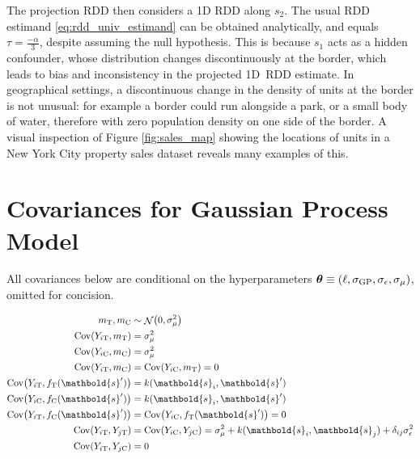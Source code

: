 \documentclass[letter]{article}
\DeclarePairedDelimiter{\parenthesis}{\lparen}{\rparen}
\newcommand{\del}[1]{\parenthesis*{#1}}
\DeclareMathOperator{\cov}{{Cov}}
\DeclareMathOperator{\normal}{\mathcal{N}}
\newcommand{\treat}{\mathrm{T}}
\newcommand{\ctrol}{\mathrm{C}}
\newcommand{\sigmaf}{\sigma_{\mathrm{GP}}}
\newcommand{\sigman}{\sigma_{\epsilon}}
\newcommand{\sigmamu}{\sigma_{\mu}}
\newcommand{\svec}{\mathbold{s}}
\newcommand{\eqlabel}[1]{\label{#1}}
\newcommand{\hyperparam}{\bm{\theta}}
\begin{document}
The projection RDD then considers a 1D RDD along \(s_2\).
The usual RDD estimand \eqref{eq:rdd_univ_estimand} can be obtained analytically, and equals \(\tau=\frac{-\alpha}{3}\), despite assuming the null hypothesis.
This is because \(s_1\) acts as a hidden confounder, whose distribution changes discontinuously at the border, which leads to bias and inconsistency in the projected 1D~RDD estimate.
In geographical settings, a discontinuous change in the density of units at the border is not unusual: for example a border could run alongside a park, or a small body of water, therefore with zero population density on one side of the border.
A visual inspection of Figure \ref{fig:sales_map} showing the locations of units in a New York City property sales dataset reveals many examples of this.
    


    	\section{Covariances for Gaussian Process Model}\label{covariances-for-gaussian-process-model}
    

\label{sec:covariances}
    	All covariances below are conditional on the hyperparameters \(\hyperparam \equiv \del{\ell,\sigmaf, \sigman, \sigmamu}\), omitted for concision.
    


    	\begin{equation}
\begin{split}
    m_\treat, m_\ctrol   &\sim \normal\del{0,\sigmamu^2} \\
    \cov(Y_{i\treat},m_\treat)  &= \sigmamu^2 \\
    \cov(Y_{i\ctrol},m_\ctrol)  &= \sigmamu^2 \\
    \cov(Y_{i\treat},m_\ctrol)  &= \cov(Y_{i\ctrol},m_\treat)  = 0 \\
    \cov\del{Y_{i\treat}, f_{\treat}(\svec')} &= k(\svec_i,\svec') \\
    \cov\del{Y_{i\ctrol}, f_{\ctrol}(\svec')} &= k(\svec_i,\svec') \\
    \cov\del{Y_{i\treat}, f_{\ctrol}(\svec')} &= \cov\del{Y_{i\ctrol}, f_{\treat}(\svec')} = 0 \\
    \cov(Y_{i\treat},Y_{j\treat}) &= \cov(Y_{i\ctrol},Y_{j\ctrol}) = \sigmamu^2 + k(\svec_i,\svec_j) + \delta_{ij}\sigman^2 \\
    \cov(Y_{i\treat},Y_{j\ctrol}) &= 0
\end{split}
\eqlabel{eq:covariances}
\end{equation}
    
\end{document}
